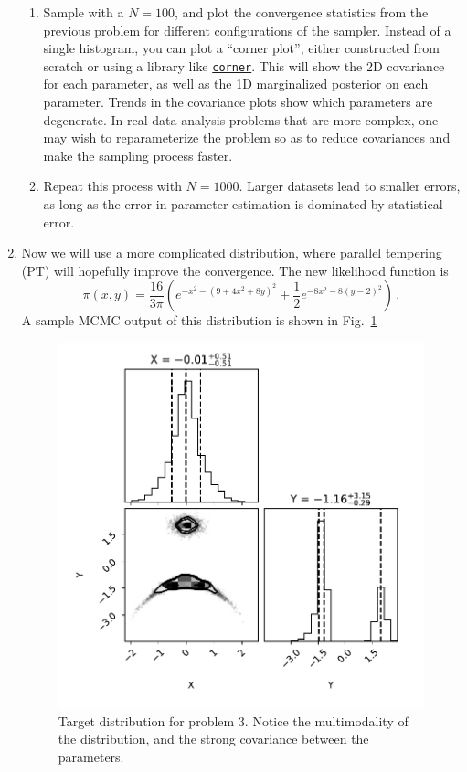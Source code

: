 \documentclass[
    aps,
    10pt,
    prd,
    notitlepage,
    onecolumn,s
    tightenlines,
    nofootinbib]{revtex4-1}
\newcommand{\software}[1]{\texttt{#1}}
\begin{document}
\begin{enumerate}
\begin{enumerate}
\item Sample with a $N=100$, and plot the convergence statistics from the previous problem for different configurations of the sampler.
Instead of a single histogram, you can plot a ``corner plot'', either constructed from scratch or using a library like \href{https://corner.readthedocs.io/en/latest/}{\software{corner}}. This will show the 2D covariance for each parameter, as well as the 1D marginalized posterior on each parameter.
Trends in the covariance plots show which parameters are degenerate.
In real data analysis problems that are more complex, one may wish to reparameterize the problem so as to reduce covariances and make the sampling process faster.
\item Repeat this process with $N=1000$.
Larger datasets lead to smaller errors, as long as the error in parameter estimation is dominated by statistical error.
\end{enumerate}
\item Now we will use a more complicated distribution, where parallel tempering (PT) will hopefully improve the convergence.
The new likelihood function is 
\begin{equation}
\pi(x,y) = \frac{16}{3\pi} \left( e^{-x^2 - ( 9+4x^2 + 8 y )^2} + \frac{1}{2} e^{-8x^2 - 8(y-2)^2} \right)\,.
\end{equation}
A sample MCMC output of this distribution is shown in Fig.~\ref{fig:rosen}
\begin{figure}
\includegraphics[width=.5\linewidth]{rosen.pdf}
\caption{Target distribution for problem 3. Notice the multimodality of the distribution, and the strong covariance between the parameters.}\label{fig:rosen}
\end{figure}


\end{enumerate}
\end{document}
